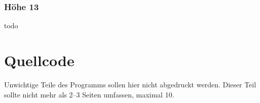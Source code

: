 {    \subsubsection{Höhe 13}

    todo
}


\section{Quellcode}\label{sec:quellcode}
Unwichtige Teile des Programms sollen hier nicht abgedruckt werden.
Dieser Teil sollte nicht mehr als 2–3 Seiten umfassen, maximal 10.

